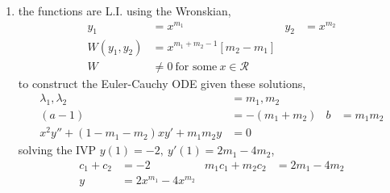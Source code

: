 \begin{enumerate}
    \item the functions are L.I. using the Wronskian,
          \begin{align}
              y_{1}           & = x^{m_{1}}                                &
              y_{2}           & = x^{m_{2}}                                  \\
              W(y_{1}, y_{2}) & = x^{m_{1} + m_{2} - 1}[m_{2} - m_{1}]       \\
              W               & \neq 0\ \text{for some}\ x \in \mathcal{R}
          \end{align}
          to construct the Euler-Cauchy ODE given these solutions,
          \begin{align}
              \lambda_{1}, \lambda_{2} & = m_{1}, m_{2}       \\
              (a-1)                    & = -(m_{1} + m_{2}) &
              b                        & = m_{1}m_{2}         \\
              x^{2}y'' + (1 - m_{1} - m_{2})xy' + m_{1}m_{2}y
                                       & = 0
          \end{align}
          solving the IVP $ y(1) = -2,\ y'(1) = 2m_{1} - 4m_{2} $,
          \begin{align}
              c_{1} + c_{2}           & = -2                      &
              m_{1}c_{1} + m_{2}c_{2} & = 2m_{1} - 4m_{2}           \\
              y                       & = 2x^{m_{1}} -4 x^{m_{2}}
          \end{align}


\end{enumerate}
